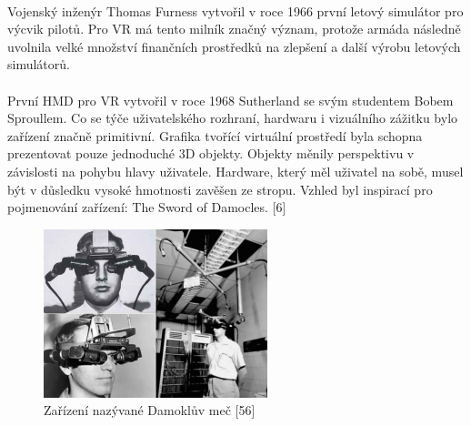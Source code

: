 \documentclass[a4paper, 12pt]{report}
\begin{document}
\\
Vojenský inženýr Thomas Furness vytvořil v roce 1966 první letový simulátor pro výcvik pilotů. Pro VR má tento milník značný význam, protože armáda následně uvolnila velké množství finančních prostředků na zlepšení a další výrobu letových simulátorů.\\
\\První HMD pro VR vytvořil v roce 1968 Sutherland se svým studentem Bobem Sproullem. Co se týče uživatelského rozhraní, hardwaru i vizuálního zážitku bylo zařízení značně primitivní.  Grafika tvořící virtuální prostředí byla schopna prezentovat pouze jednoduché 3D objekty. Objekty měnily perspektivu v závislosti na pohybu hlavy uživatele. Hardware, který měl uživatel na sobě, musel být v důsledku vysoké hmotnosti zavěšen ze stropu. Vzhled byl inspirací pro pojmenování zařízení: The Sword of Damocles. [6]

\begin{figure}[h!]
	\centering
	\includegraphics[width=6.5cm]{damoklův_meč.jpg}
	\caption{Zařízení nazývané Damoklův meč [56]}
\end{figure}
\end{document}
